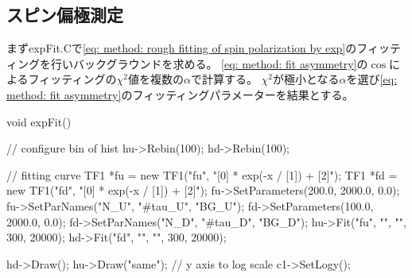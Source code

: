 \documentclass[dvipdfmx]{jsarticle}
\begin{document}
\subsection{スピン偏極測定}
まずexpFit.Cで\eqref{eq: method: rough fitting of spin polarization by exp}のフィッティングを行いバックグラウンドを求める。
\eqref{eq: method: fit asymmetry}の$\cos$によるフィッティングの$\chi^2$値を複数の$\alpha$で計算する。
$\chi^2$が極小となる$\alpha$を選び\eqref{eq: method: fit asymmetry}のフィッティングパラメーターを結果とする。

\begin{mylisting}[language=c++,caption=expFit.C]
void expFit()
{
    // configure bin of hist
    hu->Rebin(100);
    hd->Rebin(100);

    // fitting curve
    TF1 *fu = new TF1("fu", "[0] * exp(-x / [1]) + [2]");
    TF1 *fd = new TF1("fd", "[0] * exp(-x / [1]) + [2]");
    fu->SetParameters(200.0, 2000.0, 0.0);
    fu->SetParNames("N_U", "#tau_U", "BG_U");
    fd->SetParameters(100.0, 2000.0, 0.0);
    fd->SetParNames("N_D", "#tau_D", "BG_D");
    hu->Fit("fu", "", "", 300, 20000);
    hd->Fit("fd", "", "", 300, 20000);

    hd->Draw();
    hu->Draw("same");
    // y axis to log scale
    c1->SetLogy();
}
\end{mylisting}
\end{document}
